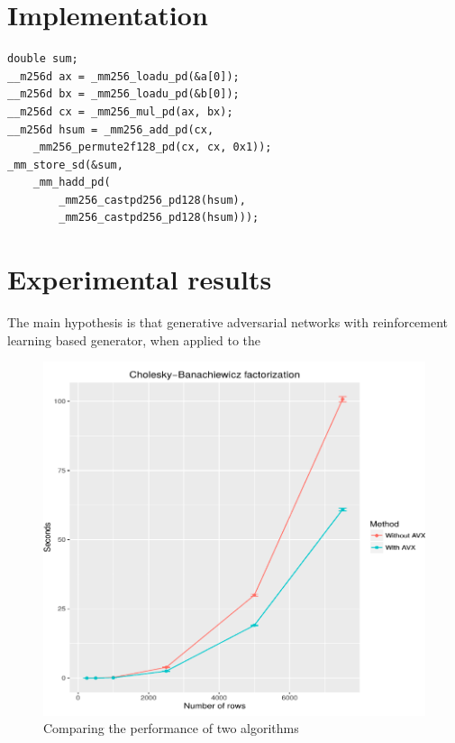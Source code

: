 \documentclass[sigplan]{acmart}
\begin{document}
\section{Implementation}

\lstset {language=C++}
\begin{lstlisting}
double sum;
__m256d ax = _mm256_loadu_pd(&a[0]);
__m256d bx = _mm256_loadu_pd(&b[0]);
__m256d cx = _mm256_mul_pd(ax, bx);
__m256d hsum = _mm256_add_pd(cx,
    _mm256_permute2f128_pd(cx, cx, 0x1));
_mm_store_sd(&sum,
    _mm_hadd_pd(
        _mm256_castpd256_pd128(hsum),
        _mm256_castpd256_pd128(hsum)));
\end{lstlisting}

\section{Experimental results}

The main hypothesis is that generative adversarial networks with reinforcement learning based generator, when applied to the

\begin{figure}[H]
  \begin{center}
  \includegraphics[width=\linewidth]{img/experiment}
  \caption{Comparing the performance of two algorithms}
  \end{center}
\end{figure}
\end{document}
